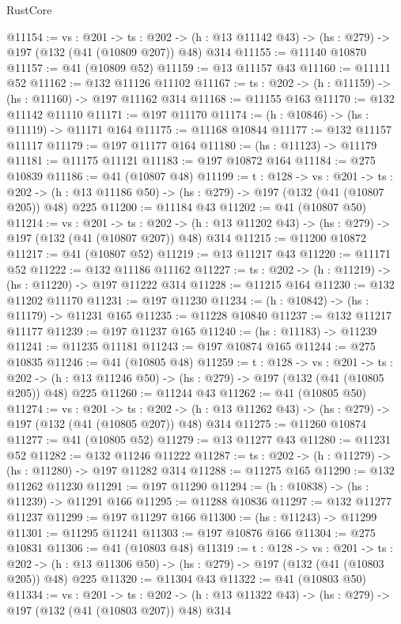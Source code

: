\begin{lexlean}{RustCore}
\begin{coremodule}
@11154 := {vs : @201} ->
  {ts : @202} -> (h : @13 @11142 @43) -> (hs : @279) -> @197 (@132 (@41 (@10809 @207)) @48) @314
@11155 := @11140 @10870
@11157 := @41 (@10809 @52)
@11159 := @13 @11157 @43
@11160 := @11111 @52
@11162 := @132 @11126 @11102
@11167 := {ts : @202} -> (h : @11159) -> (hs : @11160) -> @197 @11162 @314
@11168 := @11155 @163
@11170 := @132 @11142 @11110
@11171 := @197 @11170
@11174 := (h : @10846) -> (hs : @11119) -> @11171 @164
@11175 := @11168 @10844
@11177 := @132 @11157 @11117
@11179 := @197 @11177 @164
@11180 := (hs : @11123) -> @11179
@11181 := @11175 @11121
@11183 := @197 @10872 @164
@11184 := @275 @10839
@11186 := @41 (@10807 @48)
@11199 := {t : @128} ->
  {vs : @201} ->
  {ts : @202} -> (h : @13 @11186 @50) -> (hs : @279) -> @197 (@132 (@41 (@10807 @205)) @48) @225
@11200 := @11184 @43
@11202 := @41 (@10807 @50)
@11214 := {vs : @201} ->
  {ts : @202} -> (h : @13 @11202 @43) -> (hs : @279) -> @197 (@132 (@41 (@10807 @207)) @48) @314
@11215 := @11200 @10872
@11217 := @41 (@10807 @52)
@11219 := @13 @11217 @43
@11220 := @11171 @52
@11222 := @132 @11186 @11162
@11227 := {ts : @202} -> (h : @11219) -> (hs : @11220) -> @197 @11222 @314
@11228 := @11215 @164
@11230 := @132 @11202 @11170
@11231 := @197 @11230
@11234 := (h : @10842) -> (hs : @11179) -> @11231 @165
@11235 := @11228 @10840
@11237 := @132 @11217 @11177
@11239 := @197 @11237 @165
@11240 := (hs : @11183) -> @11239
@11241 := @11235 @11181
@11243 := @197 @10874 @165
@11244 := @275 @10835
@11246 := @41 (@10805 @48)
@11259 := {t : @128} ->
  {vs : @201} ->
  {ts : @202} -> (h : @13 @11246 @50) -> (hs : @279) -> @197 (@132 (@41 (@10805 @205)) @48) @225
@11260 := @11244 @43
@11262 := @41 (@10805 @50)
@11274 := {vs : @201} ->
  {ts : @202} -> (h : @13 @11262 @43) -> (hs : @279) -> @197 (@132 (@41 (@10805 @207)) @48) @314
@11275 := @11260 @10874
@11277 := @41 (@10805 @52)
@11279 := @13 @11277 @43
@11280 := @11231 @52
@11282 := @132 @11246 @11222
@11287 := {ts : @202} -> (h : @11279) -> (hs : @11280) -> @197 @11282 @314
@11288 := @11275 @165
@11290 := @132 @11262 @11230
@11291 := @197 @11290
@11294 := (h : @10838) -> (hs : @11239) -> @11291 @166
@11295 := @11288 @10836
@11297 := @132 @11277 @11237
@11299 := @197 @11297 @166
@11300 := (hs : @11243) -> @11299
@11301 := @11295 @11241
@11303 := @197 @10876 @166
@11304 := @275 @10831
@11306 := @41 (@10803 @48)
@11319 := {t : @128} ->
  {vs : @201} ->
  {ts : @202} -> (h : @13 @11306 @50) -> (hs : @279) -> @197 (@132 (@41 (@10803 @205)) @48) @225
@11320 := @11304 @43
@11322 := @41 (@10803 @50)
@11334 := {vs : @201} ->
  {ts : @202} -> (h : @13 @11322 @43) -> (hs : @279) -> @197 (@132 (@41 (@10803 @207)) @48) @314

\end{coremodule}
\end{lexlean}
